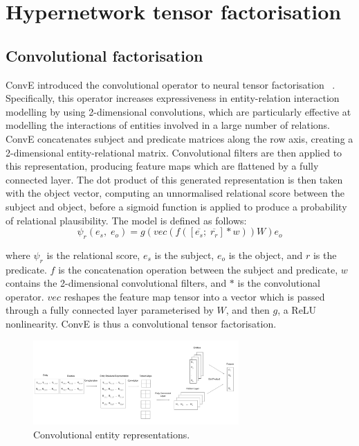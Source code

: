 \section{Hypernetwork tensor factorisation}

\subsection{Convolutional factorisation}

ConvE introduced the convolutional operator to neural tensor factorisation \unskip ~\citep{dettmers2018convolutional}. Specifically, this operator increases expressiveness in entity-relation interaction modelling by using 2-dimensional convolutions, which are particularly effective at modelling the interactions of entities involved in a large number of relations. ConvE concatenates subject and predicate matrices along the row axis, creating a 2-dimensional entity-relational matrix. Convolutional filters are then applied to this representation, producing feature maps which are flattened by a fully connected layer. The dot product of this generated representation is then taken with the object vector, computing an unnormalised relational score between the subject and object, before a sigmoid function is applied to produce a probability of relational plausibility. The model is defined as follows:
\begin{equation}
	\psi_r(e_s, \; e_o) = g(vec(f(\left [ \overline{e_s}; \; \overline{r_r} \right ]*w))W)e_o
\end{equation}

\noindent where $ \psi_r $ is the relational score, $ e_s $ is the subject, $ e_o $ is the object, and $ r $ is the predicate. $ f $ is the concatenation operation between the subject and predicate, $ w $ contains the 2-dimensional convolutional filters, and $ * $ is the convolutional operator. $ vec $ reshapes the feature map tensor into a vector which is passed through a fully connected layer parameterised by $ W $, and then $ g $, a ReLU nonlinearity. ConvE is thus a convolutional tensor factorisation. 

\begin{figure}[H]
   	\centering
    	\includegraphics[width=0.7\textwidth, height=0.4\textwidth]{convolutional_entity_representations_final}
	\caption{Convolutional entity representations.}
\end{figure}

